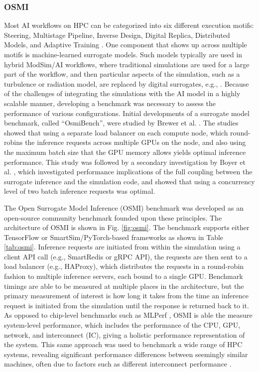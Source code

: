 \documentclass[utf8]{FrontiersinVancouver} %
\begin{document}
\subsubsection{OSMI}

Most AI workflows on HPC can be categorized into six different execution motifs: Steering, Multistage Pipeline, Inverse Design, Digital Replica, Distributed Models, and Adaptive Training \cite{brewer2024ai}. One component that shows up across multiple motifs is machine-learned surrogate models. Such models typically are used in hybrid ModSim/AI workflows, where traditional simulations are used for a large part of the workflow, and then particular aspects of the simulation, such as a turbulence or radiation model, are replaced by digital surrogates, e.g., \cite{partee2022using, martinez2022roam, bhushan2023assessment}. Because of the challenges of integrating the simulations with the AI model in a highly scalable manner, developing a benchmark was necessary to assess the performance of various configurations. Initial developments of a surrogate model benchmark, called ``OsmiBench'', were studied by Brewer et al. \cite{brewer2021production}. The studies showed that using a separate load balancer on each compute node, which round-robins the inference requests across multiple GPUs on the node, and also using the maximum batch size that the GPU memory allows yields optimal inference performance. This study was followed by a secondary investigation by Boyer et al. \cite{boyer2022scalable}, which investigated performance implications of the full coupling between the surrogate inference and the simulation code, and showed that using a concurrency level of two batch inference requests was optimal. 

The Open Surrogate Model Inference (OSMI) benchmark was developed as an open-source community benchmark founded upon these principles. The architecture of OSMI is shown in Fig. \ref{fig:osmi}. The benchmark supports either TensorFlow or SmartSim/PyTorch-based frameworks as shown in Table \ref{tab:osmi}. Inference requests are initiated from within the simulation using a client API call (e.g., SmartRedis or gRPC API), the requests are then sent to a load balancer (e.g., HAProxy), which distributes the requests in a round-robin fashion to multiple inference servers, each bound to a single GPU. Benchmark timings are able to be measured at multiple places in the architecture, but the primary measurement of interest is how long it takes from the time an inference request is initiated from the simulation until the response is returned back to it. As opposed to chip-level benchmarks such as MLPerf \cite{reddi2020mlperf}, OSMI is able the measure system-level performance, which includes the performance of the CPU, GPU, network, and interconnect (IC), giving a holistic performance representation of the system. This same approach was used to benchmark a wide range of HPC systems, revealing significant performance differences between seemingly similar machines, often due to factors such as different interconnect performance \cite{brewer2020inference}.
\end{document}
